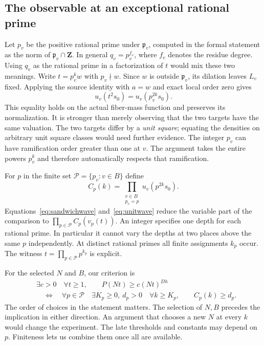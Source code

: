 \documentclass[12pt,letterpaper]{article}
\begin{document}
\subsection{The observable at an exceptional rational prime}

Let $p_v$ be the positive rational prime under $\mathfrak p_v$, computed in the formal statement as the norm of $\mathfrak p_v\cap\mathbf Z$. In general $q_v=p_v^{f_v}$, where $f_v$ denotes the residue degree. Using $q_v$ as the rational prime in a factorization of $t$ would mix these two meanings. Write $t=p_v^k w$ with $p_v\nmid w$. Since $w$ is outside $\mathfrak p_v$, its dilation leaves $L_v$ fixed. Applying the source identity with $a=w$ and exact local order zero gives
\begin{equation}
 \label{eq:unitwave}
 u_v(t^2s_0)=u_v(p_v^{2k}s_0).
\end{equation}
This equality holds on the actual fiber-mass function and preserves its normalization. It is stronger than merely observing that the two targets have the same valuation. The two targets differ by a \emph{unit square}; equating the densities on arbitrary unit square classes would need further evidence. The integer $p_v$ can have ramification order greater than one at $v$. The argument takes the entire powers $p_v^k$ and therefore automatically respects that ramification.

For $p$ in the finite set $\mathcal P=\{p_v:v\in B\}$ define
\[
 C_p(k)=\prod_{\substack{v\in B\\p_v=p}}u_v(p^{2k}s_0).
\]
Equations~\eqref{eq:sandwichwave} and~\eqref{eq:unitwave} reduce the variable part of the comparison to $\prod_{p\in\mathcal P} C_p(v_p(t))$. An integer specifies one depth for each rational prime. In particular it cannot vary the depths at two places above the same $p$ independently. At distinct rational primes all finite assignments $k_p$ occur. The witness $t=\prod_{p\in\mathcal P}p^{k_p}$ is explicit.

For the selected $N$ and $B$, our criterion is
\begin{align*}
 &\exists c>0\quad \forall t\geq1,\qquad P(Nt)\geq c (Nt)^{Dh}\\
 &\quad\Longleftrightarrow\quad
 \forall p\in\mathcal P\quad \exists K_p\geq0,\ d_p>0
            \quad \forall k\geq K_p,\qquad C_p(k)\geq d_p .
\end{align*}
The order of choices in the statement matters. The selection of $N,B$ precedes the implication in either direction. An argument that chooses a new $N$ at every $k$ would change the experiment. The late thresholds and constants may depend on $p$. Finiteness lets us combine them once all are available.
\end{document}
